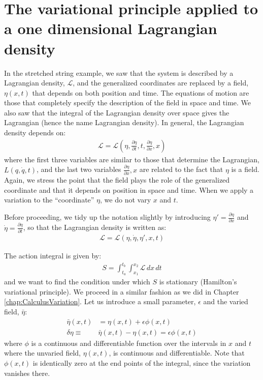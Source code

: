 \section{The variational principle applied to a one dimensional Lagrangian density}
In the stretched string example, we saw that the system is described by a Lagrangian density, $\mathcal{L}$, and the generalized coordinates are replaced by a field, $\eta(x,t)$ that depends on both position and time. The equations of motion are those that completely specify the description of the field in space and time. We also saw that the integral of the Lagrangian density over space gives the Lagrangian (hence the name Lagrangian density). In general, the Lagrangian density depends on:
\begin{align}
\mathcal{L}=\mathcal{L}(\eta,\frac{\partial\eta}{\partial t},t,\frac{\partial\eta}{\partial x},x)
\end{align}
where the first three variables are similar to those that determine the Lagrangian, $L(q,\dot q, t)$, and the last two variables $\frac{\partial\eta}{\partial x},x$ are related to the fact that $\eta$ is a field. Again, we stress the point that the field plays the role of the generalized coordinate and that it depends on position in space and time. When we apply a variation to the ``coordinate'' $\eta$, we do not vary $x$ and $t$.

Before proceeding, we tidy up the notation slightly by introducing $\eta'=\frac{\partial\eta}{\partial x}$ and $\dot\eta=\frac{\partial\eta}{\partial t}$, so that the Lagrangian density is written as:
\begin{align}
\mathcal{L}=\mathcal{L}(\eta,\dot\eta,\eta',x,t)
\end{align}

The action integral is given by:
\begin{align}
S=\int_{t_a}^{t_b} \int_{x_1}^{x_2}\mathcal{L}\,dx\,dt
\end{align}
and we want to find the condition under which $S$ is stationary (Hamilton's variational principle). We proceed in a similar fashion as we did in Chapter \ref{chap:CalculusVariation}. Let us introduce a small parameter, $\epsilon$ and the varied field, $\bar\eta$:
\begin{align}
\bar\eta(x,t)&=\eta(x,t)+\epsilon\phi(x,t)\nonumber\\
\delta \eta \equiv&\bar\eta(x,t)-\eta(x,t) = \epsilon \phi(x,t)
\end{align}
where $\phi$ is a continuous and differentiable function over the intervals in $x$ and $t$ where the unvaried field, $\eta(x,t)$, is continuous and differentiable. Note that $\phi(x,t)$ is identically zero at the end points of the integral, since the variation vanishes there.

